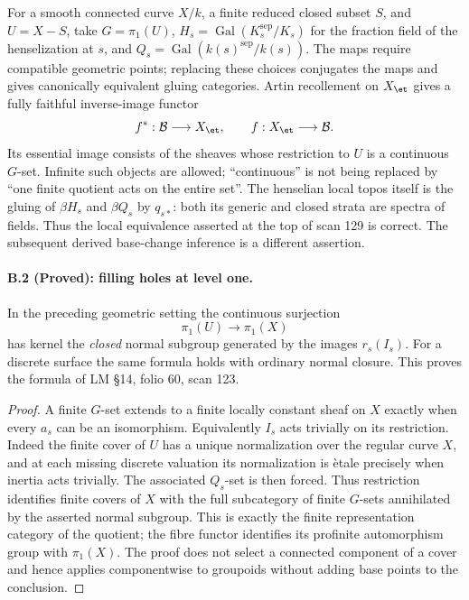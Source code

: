 For a smooth connected curve $X/k$, a finite reduced closed subset
$S$, and $U=X-S$, take $G=\pi_1(U)$,
$H_s=\operatorname{Gal}(K_s^{\mathrm{sep}}/K_s)$ for the fraction field
of the henselization at $s$, and $Q_s=\operatorname{Gal}(k(s)^{\mathrm{sep}}/k(s))$.
The maps require compatible geometric points; replacing these choices
conjugates the maps and gives canonically equivalent gluing categories.
Artin recollement on $X_{\et}$ gives a fully faithful inverse-image
functor
\[
 f^*:\mathcal B\longrightarrow X_{\et},\qquad
 f:X_{\et}\longrightarrow\mathcal B.
\]
Its essential image consists of the sheaves whose restriction to $U$
is a continuous $G$-set. Infinite such objects are allowed; ``continuous''
is not being replaced by ``one finite quotient acts on the entire set''.
The henselian local topos itself is the gluing of $\beta H_s$ and
$\beta Q_s$ by $q_{s*}$: both its generic and closed strata are spectra
of fields. Thus the local equivalence asserted at the top of scan 129
is correct. The subsequent derived base-change inference is a different
assertion.

\paragraph{B.2 (Proved): filling holes at level one.}\label{B2}
In the preceding geometric setting the continuous surjection
\[
 \pi_1(U)\longrightarrow\pi_1(X)
\]
has kernel the \emph{closed} normal subgroup generated by the images
$r_s(I_s)$. For a discrete surface the same formula holds with ordinary
normal closure. This proves the formula of LM \S14, folio 60, scan 123.

\begin{proof}
A finite $G$-set extends to a finite locally constant sheaf on $X$
exactly when every $a_s$ can be an isomorphism. Equivalently $I_s$
acts trivially on its restriction. Indeed the finite cover of $U$ has
a unique normalization over the regular curve $X$, and at each missing
discrete valuation its normalization is \`etale precisely when inertia
acts trivially. The associated $Q_s$-set is then forced. Thus restriction
identifies finite covers of $X$ with the full subcategory of finite
$G$-sets annihilated by the asserted normal subgroup. This is exactly
the finite representation category of the quotient; the fibre functor
identifies its profinite automorphism group with $\pi_1(X)$. The proof
does not select a connected component of a cover and hence applies
componentwise to groupoids without adding base points to the conclusion.
\end{proof}

